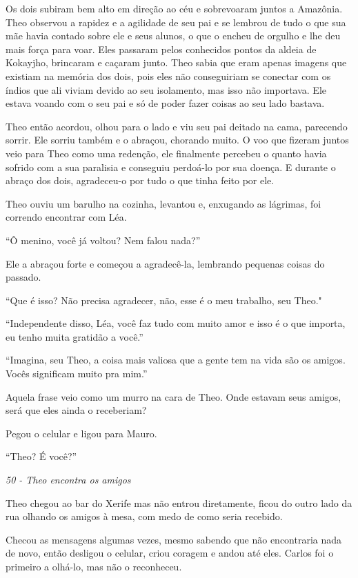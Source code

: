 Os dois subiram bem alto em direção ao céu e sobrevoaram juntos a
Amazônia. Theo observou a rapidez e a agilidade de seu pai e se lembrou
de tudo o que sua mãe havia contado sobre ele e seus alunos, o que o
encheu de orgulho e lhe deu mais força para voar. Eles passaram pelos
conhecidos pontos da aldeia de Kokayjho, brincaram e caçaram junto. Theo
sabia que eram apenas imagens que existiam na memória dos dois, pois
eles não conseguiriam se conectar com os índios que ali viviam devido ao
seu isolamento, mas isso não importava. Ele estava voando com o seu pai
e só de poder fazer coisas ao seu lado bastava.

Theo então acordou, olhou para o lado e viu seu pai deitado na cama,
parecendo sorrir. Ele sorriu também e o abraçou, chorando muito. O voo
que fizeram juntos veio para Theo como uma redenção, ele finalmente
percebeu o quanto havia sofrido com a sua paralisia e conseguiu
perdoá-lo por sua doença. E durante o abraço dos dois, agradeceu-o por
tudo o que tinha feito por ele.

Theo ouviu um barulho na cozinha, levantou e, enxugando as lágrimas, foi
correndo encontrar com Léa.

``Ô menino, você já voltou? Nem falou nada?''

Ele a abraçou forte e começou a agradecê-la, lembrando pequenas coisas
do passado.

``Que é isso? Não precisa agradecer, não, esse é o meu trabalho, seu
Theo."

``Independente disso, Léa, você faz tudo com muito amor e isso é o que
importa, eu tenho muita gratidão a você.''

``Imagina, seu Theo, a coisa mais valiosa que a gente tem na vida são os
amigos. Vocês significam muito pra mim.''

Aquela frase veio como um murro na cara de Theo. Onde estavam seus
amigos, será que eles ainda o receberiam?

Pegou o celular e ligou para Mauro.

``Theo? É você?''

\asterisc

\emph{50 - Theo encontra os amigos}

Theo chegou ao bar do Xerife mas não entrou diretamente, ficou do outro
lado da rua olhando os amigos à mesa, com medo de como seria recebido.

Checou as mensagens algumas vezes, mesmo sabendo que não encontraria
nada de novo, então desligou o celular, criou coragem e andou até eles.
Carlos foi o primeiro a olhá-lo, mas não o reconheceu.

